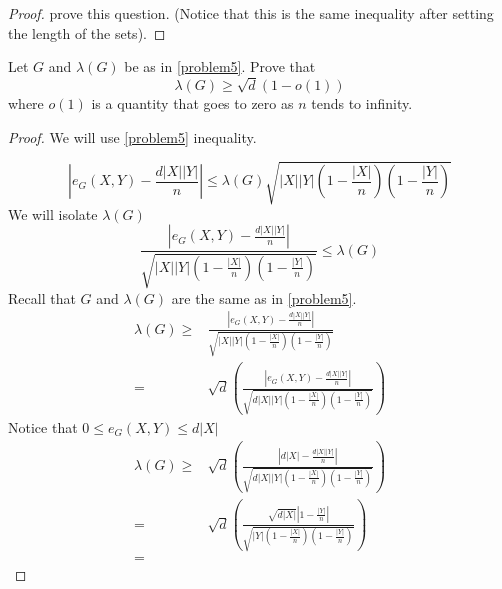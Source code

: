 \documentclass[a4paper, 11pt, oneside]{article}
\newenvironment{problem}[1]
  {\renewcommand\theinnercustomprob{#1}\innercustomprob}
  {\endinnercustomprob}
\newcommand\abs[1]{\left|#1\right|}
\begin{document}
\begin{proof}
 \cite[Lemma 8]{expander} prove this question. (Notice that this is the same inequality after setting the length of the sets).
\end{proof}		
 
 \begin{problem}{6}\label{problem6}
 Let $G$ and $\lambda(G)$ be as in \ref{problem5}. Prove that
 \begin{equation*}
 \lambda(G) \geq \sqrt{d}(1-o(1))
\end{equation*}
where $o(1)$ is a quantity that goes to zero as $n$ tends to infinity.
\end{problem}
\begin{proof}
We will use \ref{problem5} inequality.

\begin{equation*}
\left\lvert  e_G(X,Y) - \frac{d\abs{X}\abs{Y}}{n} \right\rvert \leq \lambda(G) \sqrt{  \abs{X}\abs{Y}  \left( 1 - \frac{\abs{X}}{n} \right)\left( 1 - \frac{\abs{Y}}{n} \right)} 
\end{equation*}
We will isolate $\lambda(G)$
\begin{equation*}
\frac{\left\lvert  e_G(X,Y) - \frac{d\abs{X}\abs{Y}}{n} \right\rvert}{\sqrt{  \abs{X}\abs{Y}  \left( 1 - \frac{\abs{X}}{n} \right)\left( 1 - \frac{\abs{Y}}{n} \right)} } \leq \lambda(G)
\end{equation*}
Recall that $G$ and $\lambda(G)$ are the same as in \ref{problem5}. 
\begin{align*}
\lambda(G) \geq &
\frac{\left\lvert  e_G(X,Y) - \frac{d\abs{X}\abs{Y}}{n} \right\rvert}{\sqrt{  \abs{X}\abs{Y}  \left( 1 - \frac{\abs{X}}{n} \right)\left( 1 - \frac{\abs{Y}}{n} \right)} }
\\ = & \sqrt{d}\left(\frac{\left\lvert  e_G(X,Y) - \frac{d\abs{X}\abs{Y}}{n} \right\rvert}{\sqrt{ d \abs{X}\abs{Y}  \left( 1 - \frac{\abs{X}}{n} \right)\left( 1 - \frac{\abs{Y}}{n} \right)} }\right)
\end{align*}
Notice that $0 \leq e_G(X,Y) \leq d \abs{X}$
\begin{align*}
\lambda(G) \geq &
\sqrt{d}\left(\frac{\left\lvert   d \abs{X} - \frac{d\abs{X}\abs{Y}}{n} \right\rvert}{\sqrt{ d \abs{X}\abs{Y}  \left( 1 - \frac{\abs{X}}{n} \right)\left( 1 - \frac{\abs{Y}}{n} \right)} }\right) \\ = &
\sqrt{d}\left(\frac{\sqrt{ d \abs{X}} \left\lvert  1 - \frac{\abs{Y}}{n} \right\rvert}{\sqrt{\abs{Y}  \left( 1 - \frac{\abs{X}}{n} \right)\left( 1 - \frac{\abs{Y}}{n} \right)} }\right)\\ = &

\end{align*}
\end{proof}
\end{document}
